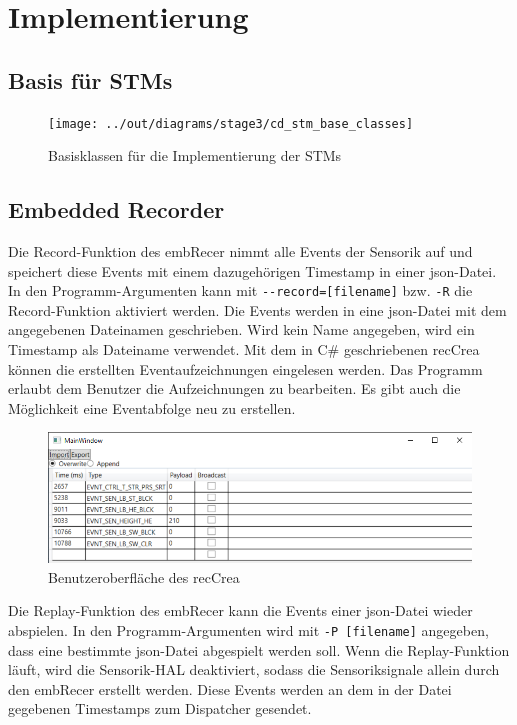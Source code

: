\chapter{Implementierung}\label{ch:implementierung}



\section{Basis für STMs}\label{sec:basis-fuer-stms}

\begin{figure}[h]
    \centering
    \texttt{[image: ../out/diagrams/stage3/cd\_stm\_base\_classes]}
    \caption{Basisklassen für die Implementierung der STMs}
    \label{fig:cd-stm-base}
\end{figure}



\section{Embedded Recorder}\label{sec:embedded-recorder}

Die Record-Funktion des \gls{embRecer} nimmt alle Events der Sensorik auf und
speichert diese Events mit einem dazugehörigen Timestamp in einer json-Datei.
In den Programm-Argumenten kann mit \verb|--record=[filename]| bzw.
\verb|-R| die Record-Funktion aktiviert werden.
Die Events werden in eine json-Datei mit dem angegebenen Dateinamen geschrieben.
Wird kein Name angegeben, wird ein Timestamp als Dateiname verwendet.
Mit dem in C\# geschriebenen \gls{recCrea} können die erstellten
Eventaufzeichnungen eingelesen werden.
Das Programm erlaubt dem Benutzer die Aufzeichnungen zu bearbeiten.
Es gibt auch die Möglichkeit eine Eventabfolge neu zu erstellen.
\begin{figure}[h]
    \centering
    \includegraphics[scale = 0.7]{anhang/EmbeddedRecordCreator.PNG}
    \caption{Benutzeroberfläche des \gls{recCrea}}
    \label{fig:embedded-record-creator}
\end{figure}

\FloatBarrier
\noindent Die Replay-Funktion des \gls{embRecer} kann die Events einer json-Datei wieder
abspielen.
In den Programm-Argumenten wird mit \verb|-P [filename]| angegeben, dass eine bestimmte json-Datei
abgespielt werden soll.
Wenn die Replay-Funktion läuft, wird die Sensorik-HAL deaktiviert,
sodass die Sensoriksignale allein durch den \gls{embRecer} erstellt werden.
Diese Events werden an dem in der Datei gegebenen Timestamps zum Dispatcher gesendet.

